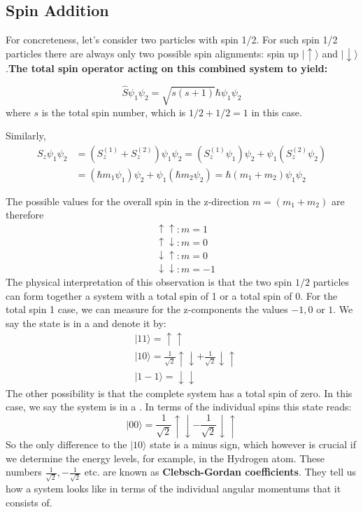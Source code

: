 \subsection{Spin Addition}
For concreteness, let’s consider two particles with spin 1/2. For such spin 1/2 particles there are always only two possible spin alignments: spin up $|\uparrow\rangle$ and $| \downarrow\rangle$.\textbf{The total spin operator acting on this combined system to yield:}
\begin{qt}
\begin{equation}
    \hat{S}\psi_{1} \psi_{2} = \sqrt{s(s+1)}\hbar\psi_{1} \psi_{2}
\end{equation}
where $s$ is the total spin number, which is $1/2+1/2=1$ in this case.

Similarly,
$$
\begin{aligned}
S_{z} \psi_{1} \psi_{2} &=\left(S_{z}^{(1)}+S_{z}^{(2)}\right) \psi_{1} \psi_{2}=\left(S_{z}^{(1)} \psi_{1}\right) \psi_{2}+\psi_{1}\left(S_{z}^{(2)} \psi_{2}\right) \\
&=\left(\hbar m_{1} \psi_{1}\right) \psi_{2}+\psi_{1}\left(\hbar m_{2} \psi_{2}\right)=\hbar\left(m_{1}+m_{2}\right) \psi_{1} \psi_{2}
\end{aligned}
$$
\end{qt}
The possible values for the overall spin in the z-direction $m=(m_1+m_2)$ are therefore
$$
\begin{aligned}
&\uparrow \uparrow: m=1\\
&\uparrow \downarrow: m=0\\
&\downarrow \uparrow: m=0\\
&\downarrow \downarrow: m=-1
\end{aligned}
$$
The physical interpretation of this observation is that the two spin $1 / 2$ particles can form together a system with a total spin of 1 or a total spin of 0. For the total spin 1 case, we can measure for the z-components the values $-1,0$ or $1 .$ We say the state is in a \textbf{} and denote it by:
$$
\begin{aligned}
&|11\rangle=\uparrow \uparrow\\
&|10\rangle=\frac{1}{\sqrt{2}} \uparrow \downarrow+\frac{1}{\sqrt{2}} \downarrow \uparrow\\
&|1-1\rangle=\downarrow \downarrow
\end{aligned}
$$
The other possibility is that the complete system has a total spin of zero. In this case, we say the system is in a \textbf{}. In terms of the individual spins this state reads:
$$
|00\rangle=\frac{1}{\sqrt{2}} \uparrow \downarrow-\frac{1}{\sqrt{2}} \downarrow \uparrow
$$
So the only difference to the $|10\rangle$ state is a minus sign, which however is crucial if we determine the energy levels, for example, in the Hydrogen atom. These numbers $\frac{1}{\sqrt{2}},-\frac{1}{\sqrt{2}}$ etc. are known as \textbf{Clebsch-Gordan coefficients}. They tell us how a system looks like in terms of the individual angular momentums that it consists of.

